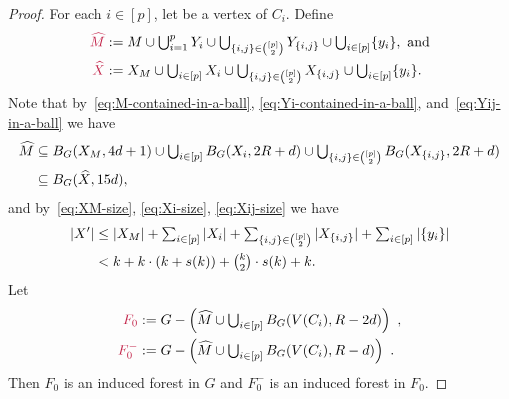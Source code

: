 \documentclass{patmorin}
\newcommand{\piotr}[1]{\textcolor{red}{Piotr: #1}}
\newenvironment{clmproof}{\begin{proof}[Proof of Claim:]\renewcommand{\qedsymbol}{\rule{1ex}{1ex}}}{\end{proof}}
\DeclarePairedDelimiter\set{\{}{\}}
\begin{document}
\begin{proof}
For each $i\in[p]$, let  be a vertex of $C_i$.
Define
\begin{align*}
  \mathdefin{\widehat{M}}&:= \textstyle M \cup \bigcup_{i=1}^p Y_i \cup \bigcup_{\set{i,j}\in\binom{[p]}{2}} Y_{\set{i,j}}\cup\bigcup_{i\in[p]}\set{y_i},\ \textrm{and}\\
  \mathdefin{\widehat{X}}&:=\textstyle X_M\cup \bigcup_{i\in[p]} X_i\cup \bigcup_{\set{i,j}\in\binom{[p]}{2}}X_{\set{i,j}}\cup\bigcup_{i\in[p]}\set{y_i}.
\end{align*}
Note that by~\eqref{eq:M-contained-in-a-ball}, \eqref{eq:Yi-contained-in-a-ball}, and~\eqref{eq:Yij-in-a-ball} we have
\begin{equation}\label{m_in_x_ball}
\begin{split}
\widehat{M}&\textstyle\subseteq B_G(X_M,4d+1) \cup \bigcup_{i\in[p]} B_G(X_i,2R+d) \cup \bigcup_{\set{i,j}\in\binom{[p]}{2}} B_G(X_{\set{i,j}},2R+d)\\
&\subseteq B_G(\widehat{X}, 15d), 
\end{split} 
\end{equation}
and by~\eqref{eq:XM-size}, \eqref{eq:Xi-size}, \eqref{eq:Xij-size} we have
\begin{equation}
\begin{split}
|X'|& \textstyle \leq |X_M| + \sum_{i\in[p]}|X_i| + \sum_{\set{i,j}\in\binom{[p]}{2}} |X_{\set{i,j}}| + \sum_{i\in[p]} |\{y_i\}|  \\
&\textstyle< k + k\cdot (k+s(k)) + \binom{k}{2}\cdot s(k) + k.
\end{split} \label{x_prime_size}
\end{equation}
Let
\begin{align*}
\mathdefin{F_0}&:=\textstyle{G-\left(\widehat{M}\cup \bigcup_{i\in[p]} B_G(V(C_i),R-2d)\right)} \enspace ,\\
\mathdefin{F^-_0}&:=\textstyle{G-\left(\widehat{M}\cup \bigcup_{i\in[p]} B_G(V(C_i),R-d)\right)} \enspace . 
\end{align*}
Then $F_0$ is an induced forest in $G$ and $F^-_0$  is an induced forest in $F_0$.





\end{proof}
\end{document}
